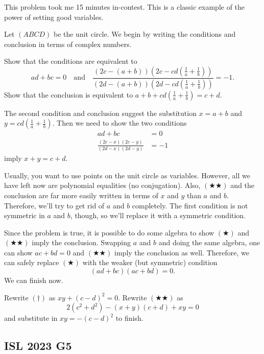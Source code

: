 \documentclass[11pt]{scrartcl}
\begin{document}
\begin{walkthrough}
	This problem took me 15 minutes in-contest. This is a classic example of the power of setting good variables.

	Let $(ABCD)$ be the unit circle. We begin by writing the conditions and conclusion in terms of complex numbers.
	\begin{walk}
		\ii Show that the conditions are equivalent to
		\[ad + bc = 0 \quad \text{and} \quad \frac{(2c - (a + b))(2c - cd(\frac1a + \frac1b))}{(2d - (a + b))(2d - cd(\frac1a + \frac1b))}= -1.\]
		\ii Show that the conclusion is equivalent to $a + b + cd(\frac1a + \frac1b) = c + d$.
	\end{walk}
	The second condition and conclusion suggest the substitution $x = a + b$ and $y = cd(\frac1a + \frac1b)$. Then we need to show the two conditions
	\begin{align*}
		ad + bc &= 0 \tag{$\bigstar$} \\
		\frac{(2c - x)(2c - y)}{(2d - x)(2d - y)} &= -1 \tag{$\bigstar\bigstar$}
	\end{align*}
	imply $x + y = c + d$.
	
	Usually, you want to use points on the unit circle as variables. However, all we have left now are polynomial equalities (no conjugation). Also, $(\bigstar\bigstar)$ and the conclusion are far more easily written in terms of $x$ and $y$ than $a$ and $b$. Therefore, we'll try to get rid of $a$ and $b$ completely. The first condition is not symmetric in $a$ and $b$, though, so we'll replace it with a symmetric condition.
	
	Since the problem is true, it is possible to do some algebra to show $(\bigstar)$ and $(\bigstar\bigstar)$ imply the conclusion. Swapping $a$ and $b$ and doing the same algebra, one can show $ac + bd = 0$ and $(\bigstar\bigstar)$ imply the conclusion as well. Therefore, we can safely replace $(\bigstar)$ with the weaker (but symmetric) condition
	\[(ad + bc)(ac + bd) = 0. \tag{$\dagger$}\]
	We can finish now.
	\begin{walk}[resume]
		\ii Rewrite $(\dagger)$ as $xy + (c - d)^2 = 0$.
		\ii Rewrite $(\bigstar\bigstar)$ as
		\[2(c^2 + d^2) - (x + y)(c + d) + xy = 0\]
		and substitute in $xy = -(c - d)^2$ to finish.
	\end{walk}
\end{walkthrough}

\pagebreak

\subsection{ISL 2023 G5}
\end{document}
